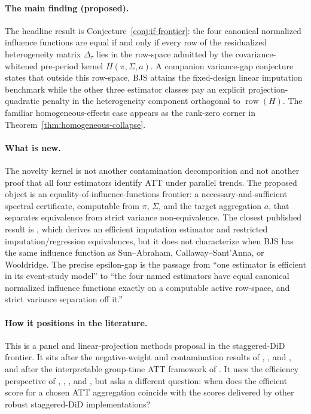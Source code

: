 \documentclass[11pt]{article}
\theoremstyle{definition}
\theoremstyle{plain}
\theoremstyle{remark}
\begin{document}
\paragraph{The main finding (proposed).}
The headline result is Conjecture~\ref{conj:if-frontier}: the four canonical
normalized influence functions are equal if and only if every row of the
residualized heterogeneity matrix \(\Delta_\tau\) lies in the row-space admitted
by the covariance-whitened pre-period kernel \(H(\pi,\Sigma,a)\).  A companion
variance-gap conjecture states that outside this row-space, BJS attains the
fixed-design linear imputation benchmark while the other three estimator
classes pay an explicit projection-quadratic penalty in the heterogeneity
component orthogonal to \(\operatorname{row}(H)\).  The familiar
homogeneous-effects case appears as the rank-zero corner in
Theorem~\ref{thm:homogeneous-collapse}.

\paragraph{What is new.}
The novelty kernel is not another contamination decomposition and not another
proof that all four estimators identify ATT under parallel trends.  The proposed
object is an equality-of-influence-functions frontier: a necessary-and-sufficient
spectral certificate, computable from \(\pi\), \(\Sigma\), and the target
aggregation \(a\), that separates equivalence from strict variance
non-equivalence.  The closest published result is \citet{BorusyakJaravelSpiess2024},
which derives an efficient imputation estimator and restricted imputation/regression
equivalences, but it does not characterize when BJS has the same influence
function as Sun--Abraham, Callaway--Sant'Anna, or Wooldridge.  The precise
epsilon-gap is the passage from ``one estimator is efficient in its event-study
model'' to ``the four named estimators have equal canonical normalized influence
functions exactly on a computable active row-space, and strict variance
separation off it.''

\paragraph{How it positions in the literature.}
This is a panel and linear-projection methods proposal in the staggered-DiD
frontier.  It sits after the negative-weight and contamination results of
\citet{deChaisemartinDHaultfoeuille2020}, \citet{GoodmanBacon2021}, and
\citet{SunAbraham2021}, and after the interpretable group-time ATT framework of
\citet{CallawaySantAnna2021}.  It uses the efficiency perspective of
\citet{SantAnnaZhao2020}, \citet{RothSantAnna2023Efficient},
\citet{BorusyakJaravelSpiess2024}, and \citet{ChenSantAnnaXie2025}, but asks a
different question: when does the efficient score for a chosen ATT aggregation
coincide with the scores delivered by other robust staggered-DiD
implementations?
\end{document}

